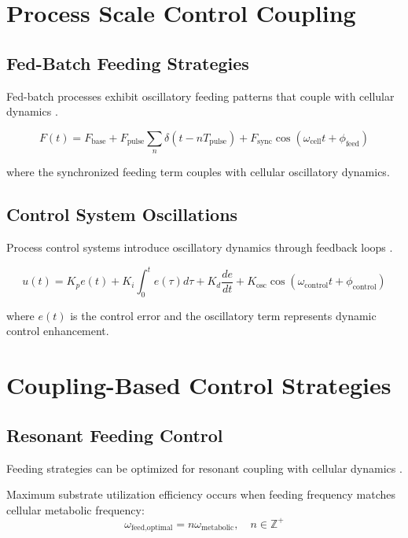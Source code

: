 \documentclass[twocolumn]{article}
\begin{document}
\section{Process Scale Control Coupling}

\subsection{Fed-Batch Feeding Strategies}

Fed-batch processes exhibit oscillatory feeding patterns that couple with cellular dynamics \citep{craven2014process}.

\begin{equation}
F(t) = F_{\text{base}} + F_{\text{pulse}} \sum_{n} \delta(t - nT_{\text{pulse}}) + F_{\text{sync}} \cos(\omega_{\text{cell}}t + \phi_{\text{feed}})
\label{eq:feeding_strategy}
\end{equation}

where the synchronized feeding term couples with cellular oscillatory dynamics.

\subsection{Control System Oscillations}

Process control systems introduce oscillatory dynamics through feedback loops \citep{stephanopoulos1984chemical}.

\begin{equation}
u(t) = K_p e(t) + K_i \int_0^t e(\tau) d\tau + K_d \frac{de}{dt} + K_{\text{osc}} \cos(\omega_{\text{control}}t + \phi_{\text{control}})
\label{eq:control_oscillations}
\end{equation}

where $e(t)$ is the control error and the oscillatory term represents dynamic control enhancement.

\section{Coupling-Based Control Strategies}

\subsection{Resonant Feeding Control}

Feeding strategies can be optimized for resonant coupling with cellular dynamics \citep{lim1997fed}.

\begin{theorem}
Maximum substrate utilization efficiency occurs when feeding frequency matches cellular metabolic frequency:
\begin{equation}
\omega_{\text{feed,optimal}} = n \omega_{\text{metabolic}}, \quad n \in \mathbb{Z}^+
\label{eq:resonant_feeding}
\end{equation}
\end{theorem}
\end{document}
